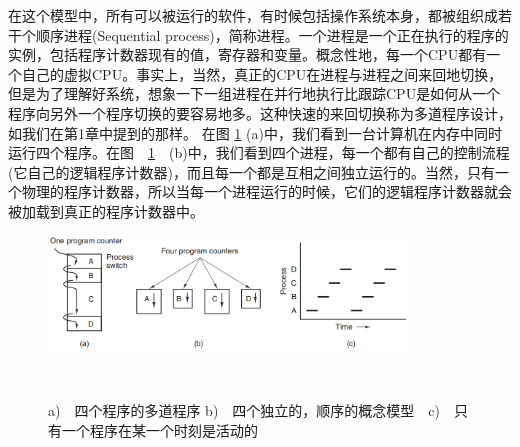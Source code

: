 	在这个模型中，所有可以被运行的软件，有时候包括操作系统本身，都被组织成若干个顺序进程(Sequential process)，简称进程。一个进程是一个正在执行的程序的实例，包括程序计数器现有的值，寄存器和变量。概念性地，每一个CPU都有一个自己的虚拟CPU。事实上，当然，真正的CPU在进程与进程之间来回地切换，但是为了理解好系统，想象一下一组进程在并行地执行比跟踪CPU是如何从一个程序向另外一个程序切换的要容易地多。这种快速的来回切换称为多道程序设计，如我们在第1章中提到的那样。
	在图 \ref{fig:processconcept} (a)中，我们看到一台计算机在内存中同时运行四个程序。在图　\ref{fig:processconcept}　(b)中，我们看到四个进程，每一个都有自己的控制流程(它自己的逻辑程序计数器)，而且每一个都是互相之间独立运行的。当然，只有一个物理的程序计数器，所以当每一个进程运行的时候，它们的逻辑程序计数器就会被加载到真正的程序计数器中。
	
	\begin{figure}[ht]\small
		\centering
		\includegraphics[width=0.85\textwidth]{FIG/2-1.png}
		\caption{a)　四个程序的多道程序 b)　四个独立的，顺序的概念模型　c)　只有一个程序在某一个时刻是活动的}　\label{fig:processconcept}
	\end{figure}
	
